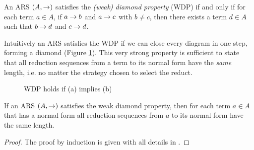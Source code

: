 \begin{definition}
	An ARS $(A,\rightarrow)$ satisfies the \emph{(weak) diamond property} (WDP) if and only if for each term $a\in A$, if $a\rightarrow b$ and $a\rightarrow c$ with $b\neq c$, then there exists a term $d\in A$ such that $b\rightarrow d$ and $c\rightarrow d$. 
\end{definition}
Intuitively an ARS satisfies the WDP if we can close every diagram in one step, forming a diamond (Figure \ref{figure:diam}). This very strong property is sufficient to state that all reduction sequences from a term to its normal form have the \emph{same} length, i.e. no matter the strategy chosen to select the reduct.
\begin{figure}
	\centering
	\qquad
	\caption{WDP holds if (a) implies (b)}
	\label{figure:diam}
\end{figure}
\begin{lemma}[]\label{lemma:weak}
	If an ARS $(A,\rightarrow)$ satisfies the weak diamond property, then for each term $a\in A$ that has a normal form all reduction sequences from $a$ to its normal form have the same length.
\end{lemma}
\begin{proof}
	The proof by induction is given with all details in \cite{lago_invariant_2005}.
\end{proof}
